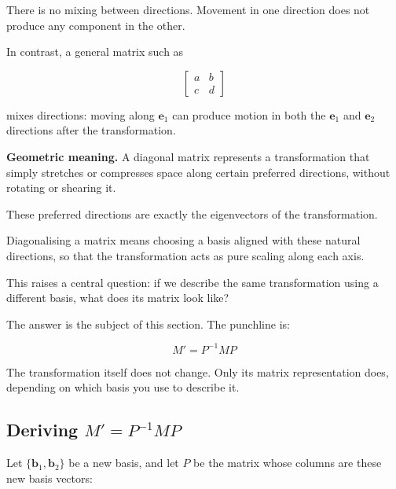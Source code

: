 \documentclass[11pt,openany]{book}
\theoremstyle{definition}
\begin{document}
\medskip

There is no mixing between directions. Movement in one direction does not produce
any component in the other.

\medskip

In contrast, a general matrix such as

\[
\begin{bmatrix}
a & b \\
c & d
\end{bmatrix}
\]

mixes directions: moving along $\mathbf{e}_1$ can produce motion in both the
$\mathbf{e}_1$ and $\mathbf{e}_2$ directions after the transformation.

\medskip

\textbf{Geometric meaning.} A diagonal matrix represents a transformation that
simply stretches or compresses space along certain preferred directions, without
rotating or shearing it.

\medskip

These preferred directions are exactly the eigenvectors of the transformation.

\medskip

\begin{keyidea} Diagonalising a matrix means choosing a basis aligned with these
natural directions, so that the transformation acts as pure scaling along each axis.\end{keyidea}

This raises a central question: if we describe the same transformation using a different
basis, what does its matrix look like?

\medskip

The answer is the subject of this section. The punchline is:

\[
\boxed{M' = P^{-1} M P}
\]

The transformation itself does not change. Only its matrix representation does,
depending on which basis you use to describe it.

\subsection{Deriving \texorpdfstring{$M' = P^{-1}MP$}{M prime equals P inverse M P}}

Let $\{\mathbf{b}_1, \mathbf{b}_2\}$ be a new basis, and let $P$ be the matrix whose
columns are these new basis vectors:
\end{document}
